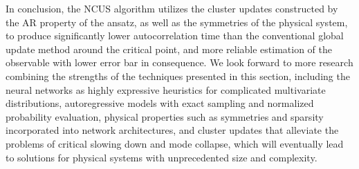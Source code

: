 In conclusion, the NCUS algorithm utilizes the cluster updates constructed by the AR property of the ansatz, as well as the symmetries of the physical system, to produce significantly lower autocorrelation time than the conventional global update method around the critical point, and more reliable estimation of the observable with lower error bar in consequence. We look forward to more research combining the strengths of the techniques presented in this section, including the neural networks as highly expressive heuristics for complicated multivariate distributions, autoregressive models with exact sampling and normalized probability evaluation, physical properties such as symmetries and sparsity incorporated into network architectures, and cluster updates that alleviate the problems of critical slowing down and mode collapse, which will eventually lead to solutions for physical systems with unprecedented size and complexity.

